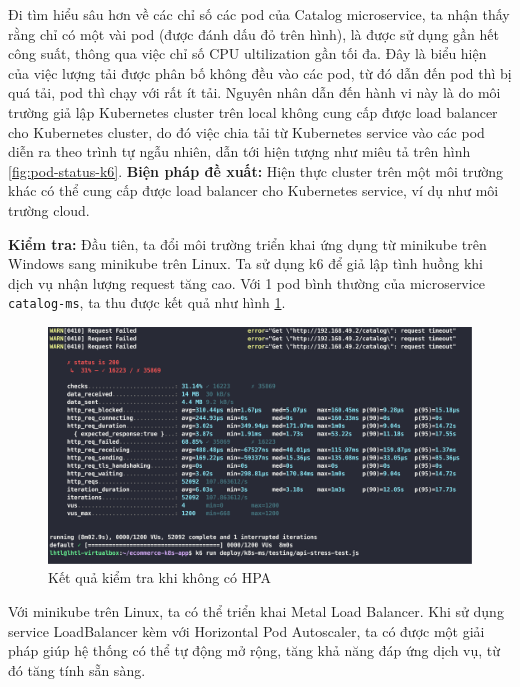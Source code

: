 Đi tìm hiểu sâu hơn về các chỉ số các pod của Catalog microservice, ta nhận thấy rằng chỉ có một vài pod (được đánh dấu đỏ trên hình), là được sử dụng gần hết công suất, thông qua việc chỉ số CPU ultilization gần tối đa. 
Đây là biểu hiện của việc lượng tải được phân bố không đều vào các pod, từ đó dẫn đến pod thì bị quá tải, pod thì chạy với rất ít tải. Nguyên nhân dẫn đến hành vi này là do môi trường giả lập Kubernetes cluster trên local không cung cấp được load balancer cho Kubernetes cluster, do đó việc chia tải từ Kubernetes service vào các pod diễn ra theo trình tự ngẫu nhiên, dẫn tới hiện tượng như miêu tả trên hình \ref{fig:pod-status-k6}.
\textbf{Biện pháp đề xuất:} Hiện thực cluster trên một môi trường khác có thể cung cấp được load balancer cho Kubernetes service, ví dụ như môi trường cloud.

\noindent \textbf{Kiểm tra:} Đầu tiên, ta đổi môi trường triển khai ứng dụng từ minikube trên Windows sang minikube trên Linux. Ta sử dụng k6 để giả lập tình huồng khi dịch vụ nhận lượng request tăng cao. Với 1 pod bình thường của microservice \lstinline|catalog-ms|, ta thu được kết quả như hình \ref{fig:catalog-stress-test-no-hpa}.
\begin{figure}[H]
  \begin{center}
    \includegraphics[scale=0.15]{images/hanh/component-catalog-no-hpa}
  \end{center}
  \caption{Kết quả kiểm tra khi không có HPA}
  \label{fig:catalog-stress-test-no-hpa}

\end{figure}

Với minikube trên Linux, ta có thể triển khai Metal Load Balancer. Khi sử dụng service LoadBalancer kèm với Horizontal Pod Autoscaler, ta có được một giải pháp giúp hệ thống có thể tự động mở rộng, tăng khả năng đáp ứng dịch vụ, từ đó tăng tính sẵn sàng.

